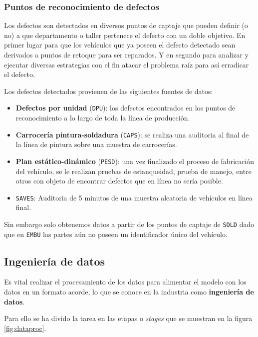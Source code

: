 \documentclass[a4paper,12pt]{article}
\begin{document}
		\subsubsection{Puntos de reconocimiento de defectos} \label{ptocptj}
		Los defectos son detectados en diversos puntos de captaje que pueden definir (o no) a que departamento o taller pertenece el defecto con un doble objetivo. En primer lugar para que los vehículos que ya poseen el defecto detectado sean derivados a puntos de retoque para ser reparados. Y en segundo para analizar y ejecutar diversas estrategias con el fin atacar el problema raíz para así erradicar el defecto.
						
		\clearpage				
						
		Los defectos detectados provienen de las siguientes fuentes de datos:
		\begin{itemize}[noitemsep, topsep=2pt]
			\item \textbf{Defectos por unidad} (\texttt{DPU}): los defectos encontrados en los puntos de reconocimiento a lo largo de toda la línea de producción.
			\item \textbf{Carrocería pintura-soldadura} (\texttt{CAPS}): se realiza una auditoria al final de la línea de pintura sobre una muestra de carrocerías.
			\item \textbf{Plan estático-dinámico} (\texttt{PESD}): una vez finalizado el proceso de fabricación del vehículo, se le realizan pruebas de estanqueidad, prueba de manejo, entre otros con objeto de encontrar defectos que en línea no sería posible.
			\item \texttt{SAVES}: Auditoria de 5 minutos de una muestra aleatoria de vehículos en línea final.
		\end{itemize}
						
		Sin embargo solo obtenemos datos a partir de los puntos de captaje de \texttt{SOLD} dado que en \texttt{EMBU} las partes aún no poseen un identificador único del vehículo.
						
		\subsection{Ingeniería de datos}
		Es vital realizar el procesamiento de los datos para alimentar el modelo con los datos en un formato acorde, lo que se conoce en la industria como \textbf{ingeniería de datos}.
						
		Para ello se ha divido la tarea en las etapas o \textit{stages} que se muestran en la figura \ref{fig:dataproc}.
						
\end{document}
